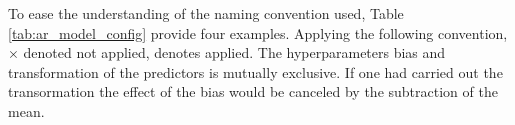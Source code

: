 To ease the understanding of the naming convention used, Table \ref{tab:ar_model_config} provide four examples. Applying the following convention, $\times$ denoted not applied, \checked denotes applied.
The hyperparameters bias and transformation of the predictors is mutually exclusive. If one had carried out the transormation the effect of the bias would be canceled by the subtraction of the mean. 
\begin{table}[h]
    \centering
    \caption{Example configuration of \acrshort{ar}-models. $\times$ denoted not applied, \checked denotes applied.}
    \label{tab:ar_model_config}
\end{table}

